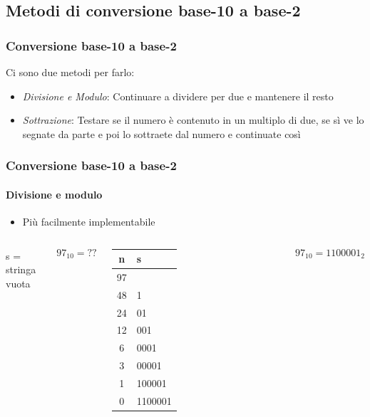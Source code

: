 \documentclass{beamer}
\begin{document}
  \subsection{Metodi di conversione base-10 a base-2}
	\begin{frame}
    \frametitle{Conversione base-10 a base-2}
    Ci sono due metodi per farlo:
    \begin{itemize}
    		\item \emph{Divisione e Modulo}: Continuare a dividere per due e mantenere il resto
    		\item \emph{Sottrazione}: Testare se il numero è contenuto in un multiplo di due, se sì ve
    			lo segnate da parte e poi lo sottraete dal numero e continuate così
    \end{itemize}
  \end{frame}
  \begin{frame}
    \frametitle{Conversione base-10 a base-2}
    \framesubtitle{Divisione e modulo}
    \begin{itemize}
    		\item Più facilmente implementabile
    \end{itemize}
    \begin{columns}
    \footnotesize{
    \begin{algorithm}[H]
    		\SetAlgoLined
			 s = stringa vuota\;			 
    \end{algorithm}
		}
	 	\footnotesize{		
			\pause
	 		$$97_{10} = ??$$
		  \pause
			\begin{tabular}{|c|l|}
			\hline
			 n & s \\
			\hline
	     97 & \\
	     48 & 1 \\
	     24 & 01 \\
	     12 & 001 \\
	     6 & 0001 \\
	     3 & 00001 \\
	     1 & 100001 \\
	     0 & 1100001 \\
			\hline
			\end{tabular}
		  $$97_{10} = 1100001_{2}$$ 
		}		
	  \end{columns}
		
		
  \end{frame}
\end{document}
